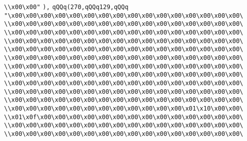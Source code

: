 \verb|\\x00\x00"|\newline
\verb|),|\newline
\verb|qQQq(270,qQQq129,qQQq|\newline
\verb|"\x00\x00\x00\x00\x00\x00\x00\x00\x00\x00\x00\x00\x00\x00\x00\x00\|\newline
\verb|\\x00\x00\x00\x00\x00\x00\x00\x00\x00\x00\x00\x00\x00\x00\x00\x00\|\newline
\verb|\\x00\x00\x00\x00\x00\x00\x00\x00\x00\x00\x00\x00\x00\x00\x00\x00\|\newline
\verb|\\x00\x00\x00\x00\x00\x00\x00\x00\x00\x00\x00\x00\x00\x00\x00\x00\|\newline
\verb|\\x00\x00\x00\x00\x00\x00\x00\x00\x00\x00\x00\x00\x00\x00\x00\x00\|\newline
\verb|\\x00\x00\x00\x00\x00\x00\x00\x00\x00\x00\x00\x00\x00\x00\x00\x00\|\newline
\verb|\\x00\x00\x00\x00\x00\x00\x00\x00\x00\x00\x00\x00\x00\x00\x00\x00\|\newline
\verb|\\x00\x00\x00\x00\x00\x00\x00\x00\x00\x00\x00\x00\x00\x00\x00\x00\|\newline
\verb|\\x00\x00\x00\x00\x00\x00\x00\x00\x00\x00\x00\x00\x00\x00\x00\x00\|\newline
\verb|\\x00\x00\x00\x00\x00\x00\x00\x00\x00\x00\x00\x00\x00\x00\x00\x00\|\newline
\verb|\\x00\x00\x00\x00\x00\x00\x00\x00\x00\x00\x00\x00\x00\x00\x00\x00\|\newline
\verb|\\x00\x00\x00\x00\x00\x00\x00\x00\x00\x00\x00\x00\x01\x10\x00\x00\|\newline
\verb|\\x01\x0f\x00\x00\x00\x00\x00\x00\x00\x00\x00\x00\x00\x00\x00\x00\|\newline
\verb|\\x00\x00\x00\x00\x00\x00\x00\x00\x00\x00\x00\x00\x00\x00\x00\x00\|\newline
\verb|\\x00\x00\x00\x00\x00\x00\x00\x00\x00\x00\x00\x00\x00\x00\x00\x00\|\newline
